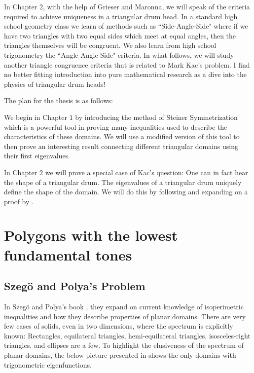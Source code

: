 \documentclass[12pt]{report}
\numberwithin{definition}{section}
\begin{document}
In Chapter $2$, with the help of Grieser and Maronna, we will speak of the criteria required to achieve uniqueness in a triangular drum head. In a standard high school geometry class we learn of methods such as ``Side-Angle-Side" where if we have two triangles with two equal sides which meet at equal angles, then the triangles themselves will be congruent. We also learn from high school trigonometry the ``Angle-Angle-Side" criteria. In what follows, we will study another triangle congruence criteria that is related to Mark Kac's problem. I find no better fitting introduction into pure mathematical research as a dive into the physics of triangular drum heads! 

	The plan for the thesis is as follows: 
	
	We begin in Chapter $1$ by introducing the method of Steiner Symmetrization which is a powerful tool in proving many inequalities used to describe the characteristics of these domains. We will use a modified version of this tool to then prove an interesting result connecting different triangular domains using their first eigenvalues. 
	
	In Chapter $2$ we will prove a special case of Kac's question: One can in fact hear the shape of a triangular drum. The eigenvalues of a triangular drum uniquely define the shape of the domain. We will do this by following and expanding on a proof by \cite{Grieser}. 
	

\break









\chapter{Polygons with the lowest fundamental tones}

\break
\section {Szegö and Polya's Problem}

 \hspace{4mm} In Szegö and Polya's book \cite{Polya}, they expand on current knowledge of isoperimetric inequalities and how they describe properties of planar domains. There are very few cases of solids, even in two dimensions, where the spectrum is explicitly known: Rectangles, equilateral triangles, hemi-equilateral triangles, isosceles-right triangles, and ellipses are a few. To highlight the elusiveness of the spectrum of planar domains, the below picture presented in  \cite{McCartin} shows the only domains with trigonometric eigenfunctions.
 
\end{document}
